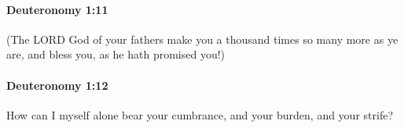 		\paragraph{Deuteronomy 1:11} %
			\label{DEUTERONOMY-1-11}

			(The LORD God of your fathers make you a thousand times so many more as ye are, and bless you, as he hath promised you!)


		\paragraph{Deuteronomy 1:12} %
			\label{DEUTERONOMY-1-12}

			How can I myself alone bear your cumbrance, and your burden, and your strife?


